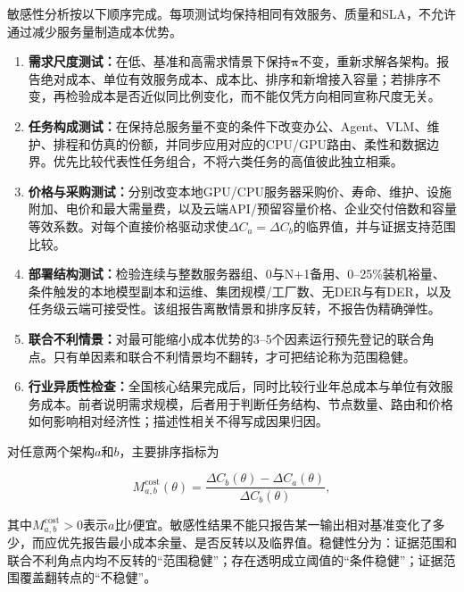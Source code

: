 \documentclass[preprint]{elsarticle}
\begin{document}
敏感性分析按以下顺序完成。每项测试均保持相同有效服务、质量和SLA，不允许通过减少服务量制造成本优势。

\begin{enumerate}
  \item \textbf{需求尺度测试：}在低、基准和高需求情景下保持$\bm\pi$不变，重新求解各架构。报告绝对成本、单位有效服务成本、成本比、排序和新增接入容量；若排序不变，再检验成本是否近似同比例变化，而不能仅凭方向相同宣称尺度无关。
  \item \textbf{任务构成测试：}在保持总服务量不变的条件下改变办公、Agent、VLM、维护、排程和仿真的份额，并同步应用对应的CPU/GPU路由、柔性和数据边界。优先比较代表性任务组合，不将六类任务的高值彼此独立相乘。
  \item \textbf{价格与采购测试：}分别改变本地GPU/CPU服务器采购价、寿命、维护、设施附加、电价和最大需量费，以及云端API/预留容量价格、企业交付倍数和容量等效系数。对每个直接价格驱动求使$\Delta C_a=\Delta C_b$的临界值，并与证据支持范围比较。
  \item \textbf{部署结构测试：}检验连续与整数服务器组、0与N+1备用、0--25\%装机裕量、条件触发的本地模型副本和运维、集团规模/工厂数、无DER与有DER，以及任务级云端可接受性。该组报告离散情景和排序反转，不报告伪精确弹性。
  \item \textbf{联合不利情景：}对最可能缩小成本优势的3--5个因素运行预先登记的联合角点。只有单因素和联合不利情景均不翻转，才可把结论称为范围稳健。
  \item \textbf{行业异质性检查：}全国核心结果完成后，同时比较行业年总成本与单位有效服务成本。前者说明需求规模，后者用于判断任务结构、节点数量、路由和价格如何影响相对经济性；描述性相关不得写成因果归因。
\end{enumerate}

对任意两个架构$a$和$b$，主要排序指标为

\begin{equation}
 M^{\mathrm{cost}}_{a,b}(\theta)
 =\frac{\Delta C_b(\theta)-\Delta C_a(\theta)}{\Delta C_b(\theta)},
 \label{eq:sensitivity-cost-margin}
\end{equation}

其中$M^{\mathrm{cost}}_{a,b}>0$表示$a$比$b$便宜。敏感性结果不能只报告某一输出相对基准变化了多少，而应优先报告最小成本余量、是否反转以及临界值。稳健性分为：证据范围和联合不利角点内均不反转的“范围稳健”；存在透明成立阈值的“条件稳健”；证据范围覆盖翻转点的“不稳健”。
\end{document}
